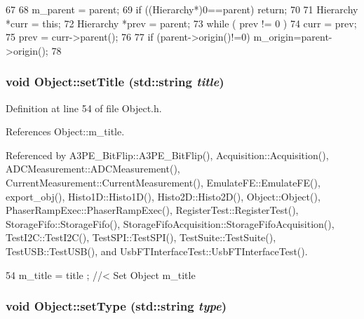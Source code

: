 \begin{DoxyCode}
67                                               {
68   m_parent = parent;
69   if ((Hierarchy*)0==parent) return;
70 
71   Hierarchy *curr = this;
72   Hierarchy *prev = parent;
73   while ( prev != 0 ){
74     curr = prev;
75     prev = curr->parent();
76   }
77   if (parent->origin()!=0) m_origin=parent->origin();
78 }
\end{DoxyCode}
\hypertarget{classObject_a89557dbbad5bcaa02652f5d7fa35d20f}{
\subsubsection[{setTitle}]{\setlength{\rightskip}{0pt plus 5cm}void Object::setTitle (std::string {\em title})}}
\label{classObject_a89557dbbad5bcaa02652f5d7fa35d20f}


Definition at line 54 of file Object.h.

References Object::m\_\-title.

Referenced by A3PE\_\-BitFlip::A3PE\_\-BitFlip(), Acquisition::Acquisition(), ADCMeasurement::ADCMeasurement(), CurrentMeasurement::CurrentMeasurement(), EmulateFE::EmulateFE(), export\_\-obj(), Histo1D::Histo1D(), Histo2D::Histo2D(), Object::Object(), PhaserRampExec::PhaserRampExec(), RegisterTest::RegisterTest(), StorageFifo::StorageFifo(), StorageFifoAcquisition::StorageFifoAcquisition(), TestI2C::TestI2C(), TestSPI::TestSPI(), TestSuite::TestSuite(), TestUSB::TestUSB(), and UsbFTInterfaceTest::UsbFTInterfaceTest().


\begin{DoxyCode}
54 { m_title = title ; } //< Set Object m_title
\end{DoxyCode}
\hypertarget{classObject_aae534cc9d982bcb9b99fd505f2e103a5}{
\subsubsection[{setType}]{\setlength{\rightskip}{0pt plus 5cm}void Object::setType (std::string {\em type})}}
\label{classObject_aae534cc9d982bcb9b99fd505f2e103a5}


